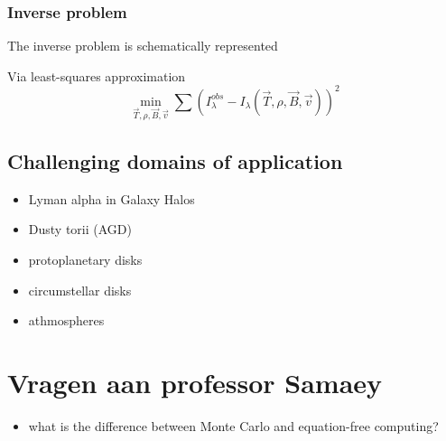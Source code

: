 \documentclass[../main/main.tex]{subfiles}
\begin{document}
\noindent{}

\subsubsection*{Inverse problem}
The inverse problem is schematically represented
\begin{center}
\end{center}
Via least-squares approximation
\begin{equation}
\min_{\vec{T},\rho,\vec{B},\vec{v}} \sum \left( I_{\lambda}^{obs} - I_\lambda(\vec{T},\rho,\vec{B},\vec{v}) \right)^2
\end{equation}

\subsection{Challenging domains of application}
\begin{itemize}
\item Lyman alpha in Galaxy Halos
\item Dusty torii (AGD)
\item protoplanetary disks
\item circumstellar disks
\item athmospheres
\end{itemize}

\newpage
\section{Vragen aan professor Samaey}
\begin{itemize}
\item what is the difference between Monte Carlo and equation-free computing?
\end{itemize}
\end{document}
